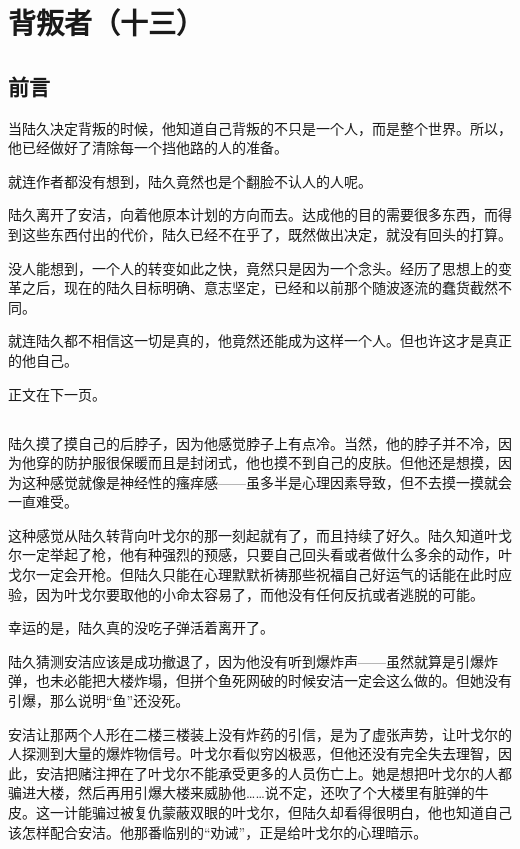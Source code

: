 \chapter{背叛者（十三）}

\section*{前言}


当陆久决定背叛的时候，他知道自己背叛的不只是一个人，而是整个世界。所以，他已经做好了清除每一个挡他路的人的准备。


就连作者都没有想到，陆久竟然也是个翻脸不认人的人呢。

\lineseparator

陆久离开了安洁，向着他原本计划的方向而去。达成他的目的需要很多东西，而得到这些东西付出的代价，陆久已经不在乎了，既然做出决定，就没有回头的打算。

没人能想到，一个人的转变如此之快，竟然只是因为一个念头。经历了思想上的变革之后，现在的陆久目标明确、意志坚定，已经和以前那个随波逐流的蠢货截然不同。

就连陆久都不相信这一切是真的，他竟然还能成为这样一个人。但也许这才是真正的他自己。

正文在下一页。

\section*{}

陆久摸了摸自己的后脖子，因为他感觉脖子上有点冷。当然，他的脖子并不冷，因为他穿的防护服很保暖而且是封闭式，他也摸不到自己的皮肤。但他还是想摸，因为这种感觉就像是神经性的瘙痒感——虽多半是心理因素导致，但不去摸一摸就会一直难受。

这种感觉从陆久转背向叶戈尔的那一刻起就有了，而且持续了好久。陆久知道叶戈尔一定举起了枪，他有种强烈的预感，只要自己回头看或者做什么多余的动作，叶戈尔一定会开枪。但陆久只能在心理默默祈祷那些祝福自己好运气的话能在此时应验，因为叶戈尔要取他的小命太容易了，而他没有任何反抗或者逃脱的可能。

幸运的是，陆久真的没吃子弹活着离开了。

陆久猜测安洁应该是成功撤退了，因为他没有听到爆炸声——虽然就算是引爆炸弹，也未必能把大楼炸塌，但拼个鱼死网破的时候安洁一定会这么做的。但她没有引爆，那么说明“鱼”还没死。

安洁让那两个人形在二楼三楼装上没有炸药的引信，是为了虚张声势，让叶戈尔的人探测到大量的爆炸物信号。叶戈尔看似穷凶极恶，但他还没有完全失去理智，因此，安洁把赌注押在了叶戈尔不能承受更多的人员伤亡上。她是想把叶戈尔的人都骗进大楼，然后再用引爆大楼来威胁他……说不定，还吹了个大楼里有脏弹的牛皮。这一计能骗过被复仇蒙蔽双眼的叶戈尔，但陆久却看得很明白，他也知道自己该怎样配合安洁。他那番临别的“劝诫”，正是给叶戈尔的心理暗示。

